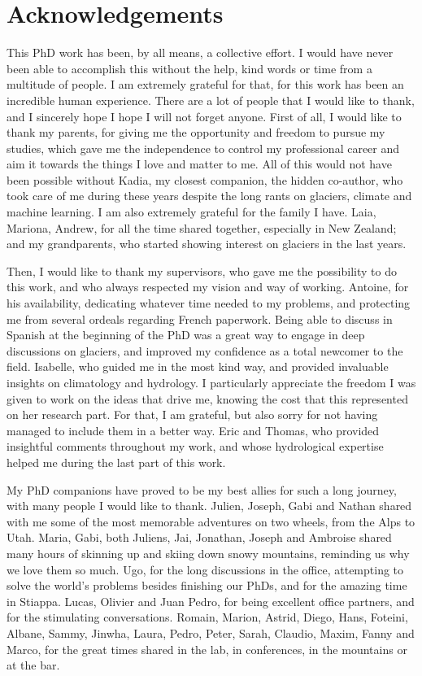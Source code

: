 \section*{Acknowledgements}

This PhD work has been, by all means, a collective effort. I would have never been able to accomplish this without the help, kind words or time from a multitude of people. I am extremely grateful for that, for this work has been an incredible human experience. There are a lot of people that I would like to thank, and I sincerely hope I hope I will not forget anyone. First of all, I would like to thank my parents, for giving me the opportunity and freedom to pursue my studies, which gave me the independence to control my professional career and aim it towards the things I love and matter to me. All of this would not have been possible without Kadia, my closest companion, the hidden co-author, who took care of me during these years despite the long rants on glaciers, climate and machine learning. I am also extremely grateful for the family I have. Laia, Mariona, Andrew, for all the time shared together, especially in New Zealand; and my grandparents, who started showing interest on glaciers in the last years.

Then, I would like to thank my supervisors, who gave me the possibility to do this work, and who always respected my vision and way of working. Antoine, for his availability, dedicating whatever time needed to my problems, and protecting me from several ordeals regarding French paperwork. Being able to discuss in Spanish at the beginning of the PhD was a great way to engage in deep discussions on glaciers, and improved my confidence as a total newcomer to the field. Isabelle, who guided me in the most kind way, and provided invaluable insights on climatology and hydrology. I particularly appreciate the freedom I was given to work on the ideas that drive me, knowing the cost that this represented on her research part. For that, I am grateful, but also sorry for not having managed to include them in a better way. Eric and Thomas, who provided insightful comments throughout my work, and whose hydrological expertise helped me during the last part of this work. 

My PhD companions have proved to be my best allies for such a long journey, with many people I would like to thank. Julien, Joseph, Gabi and Nathan shared with me some of the most memorable adventures on two wheels, from the Alps to Utah. Maria, Gabi, both Juliens, Jai, Jonathan, Joseph and Ambroise shared many hours of skinning up and skiing down snowy mountains, reminding us why we love them so much. Ugo, for the long discussions in the office, attempting to solve the world's problems besides finishing our PhDs, and for the amazing time in Stiappa. Lucas, Olivier and Juan Pedro, for being excellent office partners, and for the stimulating conversations. Romain, Marion, Astrid, Diego, Hans, Foteini, Albane, Sammy, Jinwha, Laura, Pedro, Peter, Sarah, Claudio, Maxim, Fanny and Marco, for the great times shared in the lab, in conferences, in the mountains or at the bar. 

